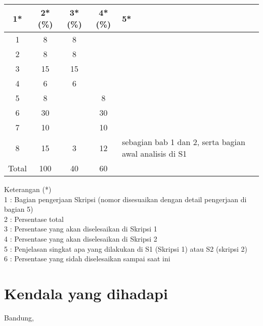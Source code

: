 \documentclass[a4paper,twoside]{article}
\begin{document}
\begin{center}
  \begin{tabular}{ | c | c | c | c | l |}
    \hline
    1*  & 2*(\%) & 3*(\%) & 4*(\%) &5*\\ \hline \hline
    1    & 8 & 8 &  &  \\ \hline
    2    & 8 & 8 &  &  \\ \hline
    3    & 15 & 15 &  &  \\ \hline
    4    & 6 & 6 &  &  \\ \hline
    5    & 8 &  & 8 &  \\ \hline
    6    & 30 &  & 30 &  \\ \hline
    7    & 10 &  & 10 &  \\ \hline
    8    & 15 & 3 & 12 & sebagian bab 1 dan 2, serta bagian awal analisis di S1 \\ \hline
    Total   & 100 & 40 & 60 &  \\ \hline
   \end{tabular}
\end{center}

Keterangan (*)\\
1 : Bagian pengerjaan Skripsi (nomor disesuaikan dengan detail pengerjaan di bagian 5)\\
2 : Persentase total \\
3 : Persentase yang akan diselesaikan di Skripsi 1 \\
4 : Persentase yang akan diselesaikan di Skripsi 2 \\
5 : Penjelasan singkat apa yang dilakukan di S1 (Skripsi 1) atau S2 (skripsi 2)\\
6 : Persentase yang sidah diselesaikan sampai saat ini 

\section{Kendala yang dihadapi}
\break

\vspace{1cm}
\centering Bandung, \tanggal\\
\vspace{2cm} \nama \\ 
\vspace{1cm}
\end{document}
